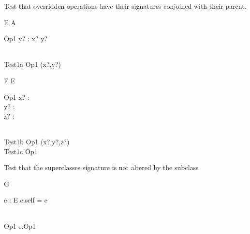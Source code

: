 Test that overridden operations have their signatures conjoined with
their parent.
\begin{class}{E}
  A\\
  \begin{op}{Op1}
    y? : \power\nat
  \where
    x? \in y?  
  \end{op}\\
  Test1a \sdef Op1 \hide (x?,y?)
\end{class}

\begin{class}{F}
  E\\
  \begin{op}{Op1}
    x? : \nat\\
    y? : \power \nat\\
    z? : \power\power \nat
  \end{op}\\
  Test1b \sdef Op1 \hide (x?,y?,z?)\\
  Test1c \sdef Op1 
\end{class}

Test that the superclasses signature is not altered by the subclass
\begin{class}{G}
  \begin{state}
    e : E
  \where
    e.self = e
  \end{state}\\
  Op1 \sdef e.Op1 \land [z? : \nat]
\end{class}
